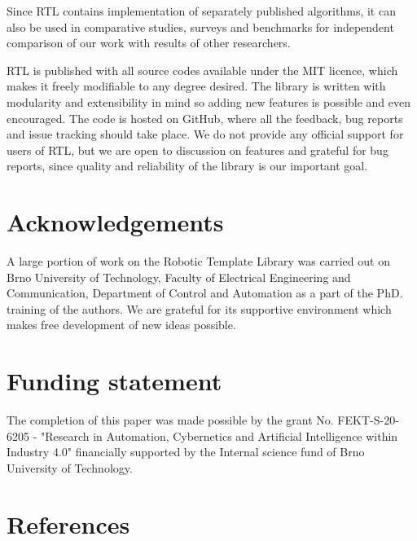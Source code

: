 \documentclass[
    letterpaper, 
    10 pt, 
    conference,
    table,
]{ieeeconf}
\begin{document}
Since RTL contains implementation of separately published algorithms, it can also be used in comparative studies, surveys and benchmarks for independent comparison of our work with results of other researchers.

RTL is published with all source codes available under the MIT licence, which makes it freely modifiable to any degree desired. The library is written with modularity and extensibility in mind so adding new features is possible and even encouraged. The code is hosted on GitHub, where all the feedback, bug reports and issue tracking should take place. We do not provide any official support for users of RTL, but we are open to discussion on features and grateful for bug reports, since quality and reliability of the library is our important goal.



\section*{Acknowledgements}

A large portion of work on the Robotic Template Library was carried out on Brno University of Technology, Faculty of Electrical Engineering and Communication, Department of Control and Automation as a part of the PhD. training of the authors. We are grateful for its supportive environment which makes free development of new ideas possible.

\section*{Funding statement}
The completion of this paper was made possible by the grant No. FEKT-S-20-6205 - "Research in Automation, Cybernetics and Artificial Intelligence within Industry 4.0" financially supported by the Internal science fund of Brno University of Technology.




\section*{References}
\renewcommand{\section}[2]{}%


\end{document}
